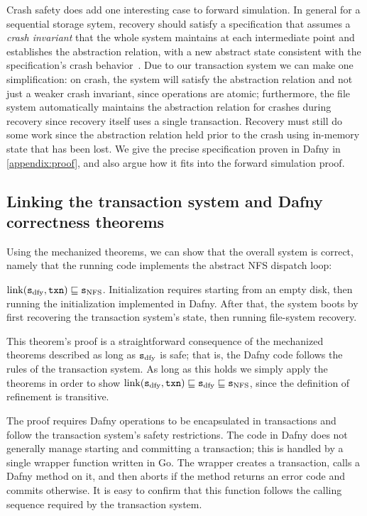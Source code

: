 Crash safety does add one interesting case to forward simulation. In general for
a sequential storage sytem, recovery should satisfy a specification that assumes
a \emph{crash invariant} that the whole system maintains at each intermediate
point and establishes the abstraction relation, with a new abstract state
consistent with the specification's crash behavior~\cite{chajed:argosy}. Due to
our transaction system we can make one simplification: on crash, the system will
satisfy the abstraction relation and not just a weaker crash invariant, since
operations are atomic; furthermore, the file system automatically maintains the
abstraction relation for crashes during recovery since recovery itself uses a
single transaction. Recovery must still do some work since the abstraction
relation held prior to the crash using in-memory state that has been lost. We
give the precise specification proven in Dafny in \autoref{appendix:proof}, and
also argue how it fits into the forward simulation proof.

\subsection{Linking the transaction system and Dafny correctness theorems}
\label{sec:proof:linking}

Using the mechanized theorems, we can show that the overall system is correct,
namely that the running code implements the abstract NFS dispatch loop:

\begin{theorem}
  $\mathrm{link}(\texttt{s}_{\mathrm{dfy}}, \texttt{txn}) \sqsubseteq \texttt{s}_{\mathrm{NFS}}$. Initialization requires
  starting from an empty disk, then running the initialization implemented in
  Dafny. After that, the system boots by first recovering the transaction
  system's state, then running file-system recovery.
  \label{thm:correctness}
\end{theorem}

This theorem's proof is a straightforward consequence of the mechanized theorems
described as long as $\texttt{s}_{\mathrm{dfy}}$ is safe; that is, the Dafny code follows the rules of
the transaction system. As long as this
holds we simply apply the theorems in order to show
$\mathrm{link}(\texttt{s}_{\mathrm{dfy}}, \texttt{txn}) \sqsubseteq \texttt{s}_{\mathrm{dfy}} \sqsubseteq \texttt{s}_{\mathrm{NFS}}$, since
the definition of refinement is transitive.

The proof requires Dafny operations to be encapsulated in transactions
and follow the transaction system's safety restrictions.
The code in Dafny does not generally manage starting and
committing a transaction; this is handled by a single wrapper function written
in Go. The wrapper creates a transaction, calls a Dafny method on it,
and then aborts if the method returns an error code and commits otherwise.
It is easy to confirm that this function follows the calling sequence required
by the transaction system.

